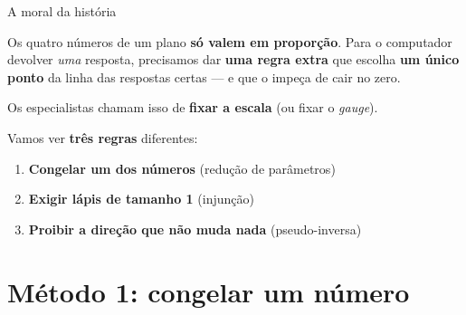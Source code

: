 \documentclass[aspectratio=169,11pt]{beamer}
\newcommand{\bnum}[1]{\textbf{\textcolor{mTeal}{#1}}}
\begin{document}
\begin{frame}{A moral da história}
  \begin{ideia}[title={Falta uma regra}]
    Os quatro números de um plano \bnum{só valem em proporção}. Para o computador devolver
    \emph{uma} resposta, precisamos dar \bnum{uma regra extra} que escolha
    \bnum{um único ponto} da linha das respostas certas --- e que o impeça de cair no zero.
  \end{ideia}
  \bigskip

  Os especialistas chamam isso de \bnum{fixar a escala} (ou fixar o \emph{gauge}).
  \bigskip

  Vamos ver \bnum{três regras} diferentes:
  \begin{enumerate}
    \item \textcolor{corReducao}{\textbf{Congelar um dos números}} (redução de parâmetros)
    \item \textcolor{corInjuncao}{\textbf{Exigir lápis de tamanho 1}} (injunção)
    \item \textcolor{corPseudo}{\textbf{Proibir a direção que não muda nada}} (pseudo-inversa)
  \end{enumerate}
\end{frame}

\section{Método 1: congelar um número}
\end{document}
